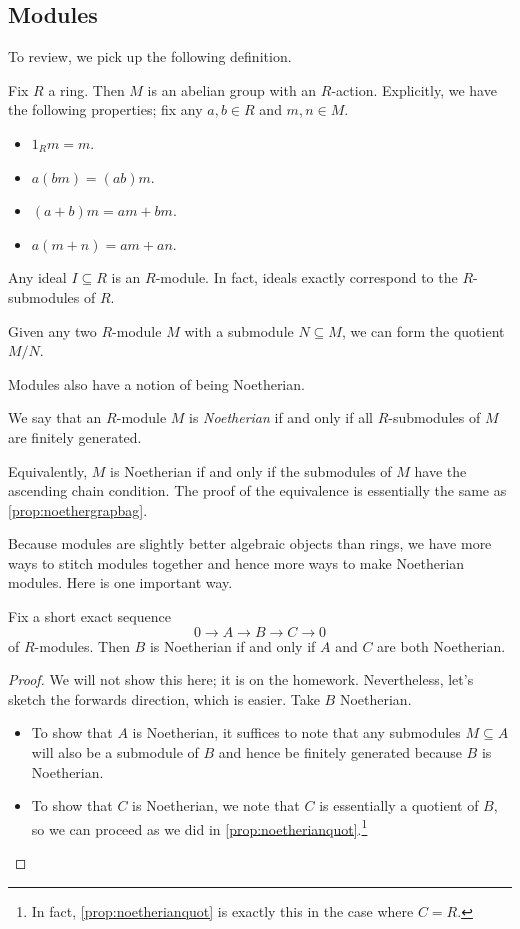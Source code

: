 \subsection{Modules}
To review, we pick up the following definition.
\begin{definition}[Module]
	Fix $R$ a ring. Then $M$ is an abelian group with an $R$-action. Explicitly, we have the following properties; fix any $a,b\in R$ and $m,n\in M$.
	\begin{itemize}
		\item $1_Rm=m$.
		\item $a(bm)=(ab)m$.
		\item $(a+b)m=am+bm$.
		\item $a(m+n)=am+an$.
	\end{itemize}
\end{definition}
\begin{example}
	Any ideal $I\subseteq R$ is an $R$-module. In fact, ideals exactly correspond to the $R$-submodules of $R$.
\end{example}
\begin{example}
	Given any two $R$-module $M$ with a submodule $N\subseteq M$, we can form the quotient $M/N$.
\end{example}
Modules also have a notion of being Noetherian.
\begin{definition}
	We say that an $R$-module $M$ is \textit{Noetherian} if and only if all $R$-submodules of $M$ are finitely generated.
\end{definition}
\begin{remark}
	Equivalently, $M$ is Noetherian if and only if the submodules of $M$ have the ascending chain condition. The proof of the equivalence is essentially the same as \autoref{prop:noethergrapbag}.
\end{remark}
Because modules are slightly better algebraic objects than rings, we have more ways to stitch modules together and hence more ways to make Noetherian modules. Here is one important way.
\begin{proposition} \label{prop:noetherianses}
	Fix a short exact sequence
	\[0\to A\to B\to C\to 0\]
	of $R$-modules. Then $B$ is Noetherian if and only if $A$ and $C$ are both Noetherian.
\end{proposition}
\begin{proof}
	We will not show this here; it is on the homework. Nevertheless, let's sketch the forwards direction, which is easier. Take $B$ Noetherian.
	\begin{itemize}
		\item To show that $A$ is Noetherian, it suffices to note that any submodules $M\subseteq A$ will also be a submodule of $B$ and hence be finitely generated because $B$ is Noetherian.
		\item To show that $C$ is Noetherian, we note that $C$ is essentially a quotient of $B$, so we can proceed as we did in \autoref{prop:noetherianquot}.\footnote{In fact, \autoref{prop:noetherianquot} is exactly this in the case where $C=R$.}
		\qedhere
	\end{itemize}
\end{proof}
